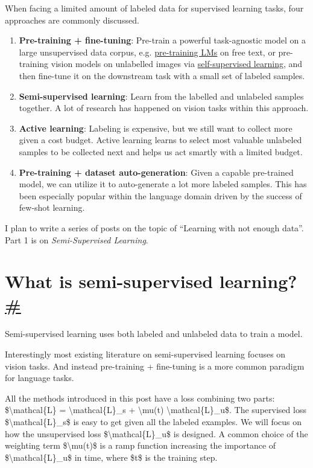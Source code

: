 When facing a limited amount of labeled data for supervised learning tasks, four approaches are commonly discussed.

\begin{enumerate}
\tightlist
\item
  \textbf{Pre-training + fine-tuning}: Pre-train a powerful task-agnostic model on a large unsupervised data corpus, e.g. \href{https://lilianweng.github.io/posts/2019-01-31-lm/}{pre-training LMs} on free text, or pre-training vision models on unlabelled images via \href{https://lilianweng.github.io/posts/2019-11-10-self-supervised/}{self-supervised learning}, and then fine-tune it on the downstream task with a small set of labeled samples.
\item
  \textbf{Semi-supervised learning}: Learn from the labelled and unlabeled samples together. A lot of research has happened on vision tasks within this approach.
\item
  \textbf{Active learning}: Labeling is expensive, but we still want to collect more given a cost budget. Active learning learns to select most valuable unlabeled samples to be collected next and helps us act smartly with a limited budget.
\item
  \textbf{Pre-training + dataset auto-generation}: Given a capable pre-trained model, we can utilize it to auto-generate a lot more labeled samples. This has been especially popular within the language domain driven by the success of few-shot learning.
\end{enumerate}

I plan to write a series of posts on the topic of ``Learning with not enough data''. Part 1 is on \emph{Semi-Supervised Learning}.

\section{\texorpdfstring{What is semi-supervised learning?\hyperref[what-is-semi-supervised-learning]{\#}}{What is semi-supervised learning?\#}}\label{what-is-semi-supervised-learning}

Semi-supervised learning uses both labeled and unlabeled data to train a model.

Interestingly most existing literature on semi-supervised learning focuses on vision tasks. And instead pre-training + fine-tuning is a more common paradigm for language tasks.

All the methods introduced in this post have a loss combining two parts: \$\textbackslash mathcal\{L\} = \textbackslash mathcal\{L\}\_s + \textbackslash mu(t) \textbackslash mathcal\{L\}\_u\$. The supervised loss \$\textbackslash mathcal\{L\}\_s\$ is easy to get given all the labeled examples. We will focus on how the unsupervised loss \$\textbackslash mathcal\{L\}\_u\$ is designed. A common choice of the weighting term \$\textbackslash mu(t)\$ is a ramp function increasing the importance of \$\textbackslash mathcal\{L\}\_u\$ in time, where \$t\$ is the training step.

